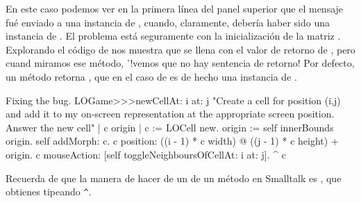 \documentclass[a4paper,10pt,twoside]{book}
\begin{document}
{%
En este caso podemos ver en la primera l\'inea del panel superior que el mensaje  fu\'e enviado a una instancia de , cuando, claramente, deber\'ia haber sido una instancia de .
El problema est\'a seguramente con la inicializaci\'on de la matriz .
Explorando el c\'odigo de  nos muestra que  se llena con el valor de retorno de , pero cuand miramos ese m\'etodo, '!vemos que no hay sentencia de retorno!
Por defecto, un m\'etodo retorna , que en el caso de  es de hecho una instancia de .



\begin{method}{Fixing the bug.}
LOGame>>>newCellAt: i at: j
   "Create a cell for position (i,j) and add it to my on-screen
   representation at the appropriate screen position.  Answer the new cell"
   | c origin |
   c := LOCell new.
   origin := self innerBounds origin.
   self addMorph: c.
   c position: ((i - 1) * c width) @ ((j - 1) * c height) + origin.
   c mouseAction: [self toggleNeighboursOfCellAt: i at: j].
   ^ c
\end{method}

\noindent
Recuerda de  que la manera de hacer  de un  de un m\'etodo en Smalltalk es \ct{^}, que obtienes tipeando \verb|^|.

}
\end{document}
